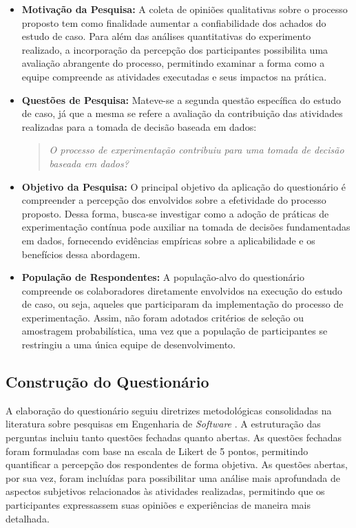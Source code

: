 \begin{itemize}
    \item \textbf{Motivação da Pesquisa:} A coleta de opiniões qualitativas sobre o processo proposto tem como finalidade aumentar a confiabilidade dos achados do estudo de caso. Para além das análises quantitativas do experimento realizado, a incorporação da percepção dos participantes possibilita uma avaliação abrangente do processo, permitindo examinar a forma como a equipe compreende as atividades executadas e seus impactos na prática.

    \item \textbf{Questões de Pesquisa:} Mateve-se a segunda questão específica do estudo de caso, já que a mesma se refere a avaliação da contribuição das atividades realizadas para a tomada de decisão baseada em dados: 
    
    \begin{quote}
        \textit{O processo de experimentação contribuiu para uma tomada de decisão baseada em dados?}
    \end{quote}

    \item \textbf{Objetivo da Pesquisa:} O principal objetivo da aplicação do questionário é compreender a percepção dos envolvidos sobre a efetividade do processo proposto. Dessa forma, busca-se investigar como a adoção de práticas de experimentação contínua pode auxiliar na tomada de decisões fundamentadas em dados, fornecendo evidências empíricas sobre a aplicabilidade e os benefícios dessa abordagem.

    \item \textbf{População de Respondentes:} A população-alvo do questionário compreende os colaboradores diretamente envolvidos na execução do estudo de caso, ou seja, aqueles que participaram da implementação do processo de experimentação. Assim, não foram adotados critérios de seleção ou amostragem probabilística, uma vez que a população de participantes se restringiu a uma única equipe de desenvolvimento.
\end{itemize}

\subsection{Construção do Questionário}

A elaboração do questionário seguiu diretrizes metodológicas consolidadas na literatura sobre pesquisas em Engenharia de \textit{Software} \cite{lin_mello_guidelines}. A estruturação das perguntas incluiu tanto questões fechadas quanto abertas. As questões fechadas foram formuladas com base na escala de Likert de 5 pontos, permitindo quantificar a percepção dos respondentes de forma objetiva. As questões abertas, por sua vez, foram incluídas para possibilitar uma análise mais aprofundada de aspectos subjetivos relacionados às atividades realizadas, permitindo que os participantes expressassem suas opiniões e experiências de maneira mais detalhada.

